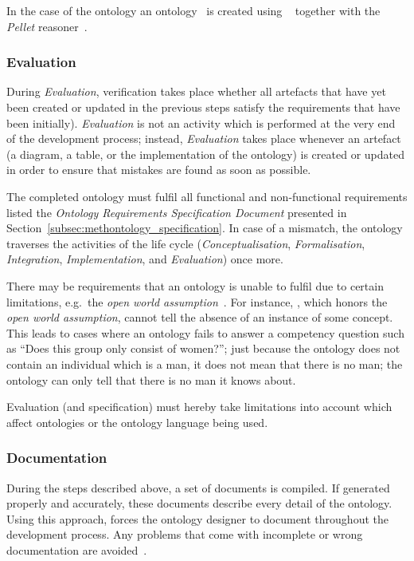 In the case of the \smarthomeweather ontology an  ontology~\cite{OWL} is created using \protege~\cite{protege} together with the \emph{Pellet} reasoner~\cite{pellet}.

\subsubsection{Evaluation}

During \emph{Evaluation}, verification takes place whether all artefacts that have yet been created or updated in the previous steps satisfy the requirements that have been initially). \emph{Evaluation} is not an activity which is performed at the very end of the development process; instead, \emph{Evaluation} takes place whenever an artefact (a diagram, a table, or the implementation of the ontology) is created or updated in order to ensure that mistakes are found as soon as possible.

The completed ontology must fulfil all functional and non-functional requirements listed the \emph{Ontology Requirements Specification Document} presented in Section~\ref{subsec:methontology_specification}. In case of a mismatch, the ontology traverses the activities of the life cycle (\emph{Conceptualisation}, \emph{Formalisation}, \emph{Integration}, \emph{Implementation}, and \emph{Evaluation}) once more.

There may be requirements that an ontology is unable to fulfil due to certain limitations, e.g.\ the \emph{open world assumption}~\cite{open_world_assumption1}. For instance, , which honors the \emph{open world assumption}, cannot tell the absence of an instance of some concept. This leads to cases where an ontology fails to answer a competency question such as ``Does this group only consist of women?''; just because the ontology does not contain an individual which is a man, it does not mean that there is no man; the ontology can only tell that there is no man it knows about.

Evaluation (and specification) must hereby take limitations into account which affect ontologies or the ontology language being used.

\subsubsection{Documentation}

During the steps described above, a set of documents is compiled. If generated properly and accurately, these documents describe every detail of the ontology. Using this approach, \methontology forces the ontology designer to document throughout the development process. Any problems that come with incomplete or wrong documentation are avoided~\cite{SoftwareDocumentationProblems}.

